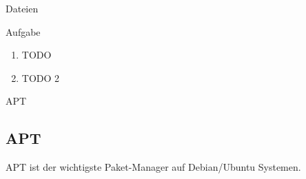 \begin{frame}{Dateien}

    \begin{alertblock}{Aufgabe}
        \begin{enumerate}
            \item TODO
            \item TODO 2
        \end{enumerate}
    \end{alertblock}

\end{frame}

\begin{frame}{APT}
    \subsection{APT}\label{subsec:apt}

    APT ist der wichtigste Paket-Manager auf Debian/Ubuntu Systemen.



\end{frame}